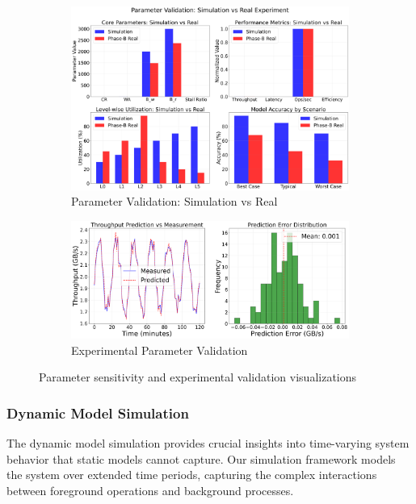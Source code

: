 \documentclass[11pt]{article}
\begin{document}
\begin{figure}[H]
\centering
\begin{subfigure}{0.48\textwidth}
\centering
\includegraphics[width=\textwidth]{experiments/2025-09-05/parameter_validation_comparison.png}
\caption{Parameter Validation: Simulation vs Real}
\label{fig:parameter_validation}
\end{subfigure}
\hfill
\begin{subfigure}{0.48\textwidth}
\centering
\includegraphics[width=\textwidth]{experiments/2025-09-05/experimental_parameter_validation.png}
\caption{Experimental Parameter Validation}
\label{fig:experimental_validation}
\end{subfigure}
\caption{Parameter sensitivity and experimental validation visualizations}
\end{figure}

\subsubsection{Dynamic Model Simulation}
The dynamic model simulation provides crucial insights into time-varying system behavior that static models cannot capture. Our simulation framework models the system over extended time periods, capturing the complex interactions between foreground operations and background processes.
\end{document}
